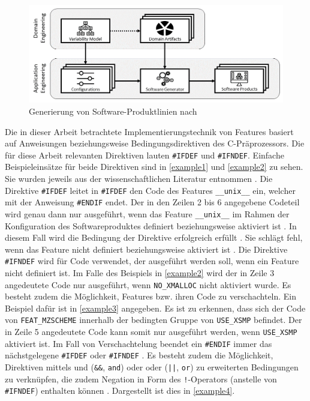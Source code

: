 \begin{figure}[t]
    \centering
    \includegraphics[width=\textwidth]{images/SPL}
    \caption{Generierung von Software-Produktlinien nach \cite{Thuem2014}\label{fig:spl}}
\end{figure}

Die in dieser Arbeit betrachtete Implementierungstechnik von Features basiert auf Anweisungen beziehungsweise Bedingungsdirektiven des C-Präprozessors. Die für diese Arbeit relevanten Direktiven lauten \texttt{\#IFDEF} und \texttt{\#IFNDEF}. Einfache Beispieleinsätze für beide Direktiven sind in \autoref{example1} und \autoref{example2} zu sehen. Sie wurden jeweils aus der wissenschaftlichen Literatur entnommen \cite{Medeiros2018,Preschern2019}. Die Direktive \texttt{\#IFDEF} leitet in \texttt{\#IFDEF} den Code des Features \texttt{\_\_unix\_\_} ein, welcher mit der Anweisung \texttt{\#ENDIF} endet. Der in den Zeilen 2 bis 6 angegebene Codeteil wird genau dann nur ausgeführt, wenn das Feature \texttt{\_\_unix\_\_} im Rahmen der Konfiguration des Softwareproduktes definiert beziehungsweise aktiviert ist \cite{Stallmann2016}. In diesem Fall wird die Bedingung der Direktive erfolgreich erfüllt \cite{Stallmann2016}. Sie schlägt fehl, wenn das Feature nicht definiert beziehungsweise aktiviert ist \cite{Stallmann2016}. Die Direktive \texttt{\#IFNDEF} wird für Code verwendet, der ausgeführt werden soll, wenn ein Feature nicht definiert ist. Im Falle des Beispiels in \autoref{example2} wird der in Zeile 3 angedeutete Code nur ausgeführt, wenn \texttt{NO\_XMALLOC} nicht aktiviert wurde.
Es besteht zudem die Möglichkeit, Features bzw. ihren Code zu verschachteln. Ein Beispiel dafür ist in \autoref{example3} angegeben. Es ist zu erkennen, dass sich der Code von \texttt{FEAT\_MZSCHEME} innerhalb der bedingten Gruppe von \texttt{USE\_XSMP} befindet. Der in Zeile 5 angedeutete Code kann somit nur ausgeführt werden, wenn \texttt{USE\_XSMP} aktiviert ist. Im Fall von Verschachtelung beendet ein \texttt{\#ENDIF} immer das nächstgelegene \texttt{\#IFDEF} oder \texttt{\#IFNDEF} \cite{Stallmann2016}. Es besteht zudem die Möglichkeit, Direktiven mittels \glqq und\grqq{} (\texttt{\&\&}, \texttt{and}) oder \glqq oder\grqq{} (\texttt{||}, \texttt{or}) zu erweiterten Bedingungen zu verknüpfen, die zudem Negation in Form des \texttt{!}-Operators (anstelle von \texttt{\#IFNDEF}) enthalten können \cite{Stallmann2016,Queiroz2015}. Dargestellt ist dies in \autoref{example4}.

